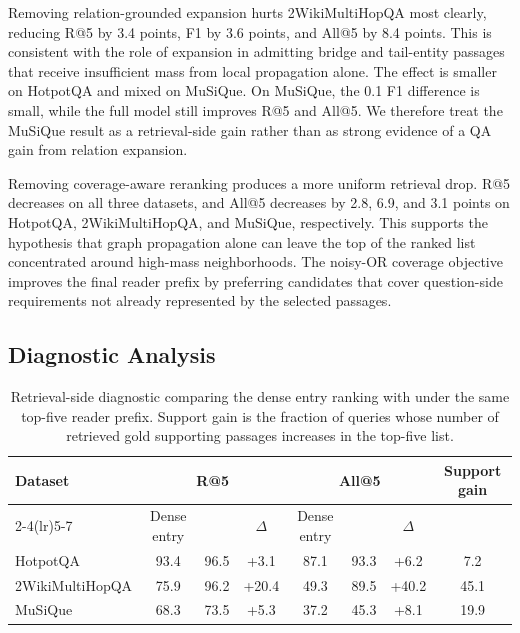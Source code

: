 Removing relation-grounded expansion hurts 2WikiMultiHopQA most clearly,
reducing R@5 by 3.4 points, F1 by 3.6 points, and All@5 by 8.4 points.
This is consistent with the role of expansion in admitting bridge and
tail-entity passages that receive insufficient mass from local
propagation alone. The effect is smaller on HotpotQA and mixed on
MuSiQue. On MuSiQue, the 0.1 F1 difference is small, while the full
model still improves R@5 and All@5. We therefore treat the MuSiQue result
as a retrieval-side gain rather than as strong evidence of a QA gain from
relation expansion.

Removing coverage-aware reranking produces a more uniform retrieval
drop. R@5 decreases on all three datasets, and All@5 decreases by 2.8,
6.9, and 3.1 points on HotpotQA, 2WikiMultiHopQA, and MuSiQue,
respectively. This supports the hypothesis that graph propagation alone
can leave the top of the ranked list concentrated around high-mass
neighborhoods. The noisy-OR coverage objective improves the final reader
prefix by preferring candidates that cover question-side requirements not
already represented by the selected passages.

\subsection{Diagnostic Analysis}
\label{sec:experiments:analysis}

\begin{table}[t]
\centering
\small
\setlength{\tabcolsep}{4pt}
\begin{tabular}{lccc ccc c}
\toprule
Dataset & \multicolumn{3}{c}{R@5} &
\multicolumn{3}{c}{All@5} &
Support gain \\
\cmidrule(lr){2-4}\cmidrule(lr){5-7}
& Dense entry & \methodname{} & $\Delta$ &
Dense entry & \methodname{} & $\Delta$ & \\
\midrule
HotpotQA & 93.4 & 96.5 & +3.1 & 87.1 & 93.3 & +6.2 & 7.2 \\
2WikiMultiHopQA & 75.9 & 96.2 & +20.4 & 49.3 & 89.5 & +40.2 & 45.1 \\
MuSiQue & 68.3 & 73.5 & +5.3 & 37.2 & 45.3 & +8.1 & 19.9 \\
\bottomrule
\end{tabular}
\caption{Retrieval-side diagnostic comparing the dense entry ranking
with \methodname{} under the same top-five reader prefix. Support gain is
the fraction of queries whose number of retrieved gold supporting
passages increases in the top-five list.}
\label{tab:flow-diagnostic}
\end{table}

